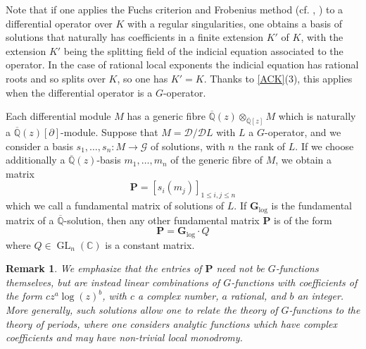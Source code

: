 \documentclass[10pt]{article}
\numberwithin{equation}{section}
\theoremstyle{plain}
\newtheorem{rem}[thm]{Remark}
\theoremstyle{definition}
\theoremstyle{remark}
\newcommand{\greg}[1]{{\color{blue} \sf   Greg: [#1]}}
\newcommand{\GL}{\operatorname{GL}}
\newcommand{\Qbar}{\overline{\mathbb{Q}}}
\newcommand{\Q}{\mathbb{Q}}
\begin{document}
Note that if one applies the Fuchs criterion and Frobenius method (cf. \cite[Sec. 1.1]{zbMATH07441738}, \cite[Ch. III, \S1]{zbMATH00041964}) to a differential operator over $K$ with a regular singularities, one obtains a basis of solutions that naturally has coefficients in a finite extension $K'$ of $K$, with the extension $K'$ being the splitting field of the indicial equation associated to the operator. In the case of rational local exponents the indicial equation has rational roots and so splits over $K$, so one has $K' = K$. Thanks to \autoref{ACK}(3), this applies when the differential operator is a $G$-operator.





Each differential module $M$ has a generic fibre $\Qbar(z) \otimes_{\Qbar[z]} M$ which is naturally a $\Qbar(z)[\partial]$-module. Suppose that $M = \mathcal{D} / \mathcal{D} L$ with $L$ a $G$-operator, and we consider a basis $s_{1}, \hdots, s_{n} : M \to \mathcal{G}$ of solutions, with $n$ the rank of $L$. If we choose additionally a $\Qbar(z)$-basis $m_{1}, \hdots, m_{n}$ of the generic fibre of $M$, we obtain a matrix 
\[ \mathbf{P} = [ s_{i}(m_{j}) ]_{1 \leq i, j \leq n} \]
which we call a fundamental matrix of solutions of $L$. If $\mathbf{G}_{\textrm{log}}$ is the fundamental matrix of a $\Qbar$-solution, then any other fundamental matrix $\mathbf{P}$ is of the form 
\begin{equation}\label{Qacts}
    \mathbf{P} = \mathbf{G}_{\textrm{log}} \cdot  Q
\end{equation}
where $Q \in \GL_{n}(\mathbb{C})$ is a constant matrix.

\begin{rem}
We emphasize that the entries of $\mathbf{P}$ need not be $G$-functions themselves, but are instead linear combinations of $G$-functions with coefficients of the form $c z^{a} \log(z)^{b}$, with $c$ a complex number, $a$ rational, and $b$ an integer. More generally, such solutions allow one to relate the theory of $G$-functions to the theory of periods, where one considers analytic functions which have complex coefficients and may have non-trivial local monodromy.
\end{rem}
\end{document}

